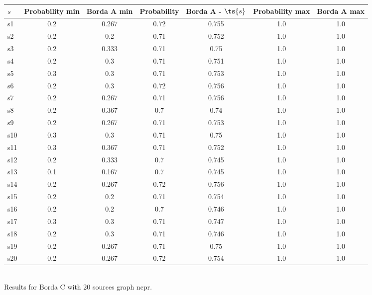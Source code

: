 \documentclass{article}
\begin{document}
\noindent\begin{tabular}{|l|c|c|c|c|c|c|}
\hline
$s$& Probability min & Borda A min & Probability & Borda A - $\ts{s}$ & Probability max & Borda A max\\
\hline
s1 &0.2 & 0.267 & 0.72 & 0.755 & 1.0 & 1.0\\
\hline
s2 &0.2 & 0.2 & 0.71 & 0.752 & 1.0 & 1.0\\
\hline
s3 &0.2 & 0.333 & 0.71 & 0.75 & 1.0 & 1.0\\
\hline
s4 &0.2 & 0.3 & 0.71 & 0.751 & 1.0 & 1.0\\
\hline
s5 &0.3 & 0.3 & 0.71 & 0.753 & 1.0 & 1.0\\
\hline
s6 &0.2 & 0.3 & 0.72 & 0.756 & 1.0 & 1.0\\
\hline
s7 &0.2 & 0.267 & 0.71 & 0.756 & 1.0 & 1.0\\
\hline
s8 &0.2 & 0.367 & 0.7 & 0.74 & 1.0 & 1.0\\
\hline
s9 &0.2 & 0.267 & 0.71 & 0.753 & 1.0 & 1.0\\
\hline
s10 &0.3 & 0.3 & 0.71 & 0.75 & 1.0 & 1.0\\
\hline
s11 &0.3 & 0.367 & 0.71 & 0.752 & 1.0 & 1.0\\
\hline
s12 &0.2 & 0.333 & 0.7 & 0.745 & 1.0 & 1.0\\
\hline
s13 &0.1 & 0.167 & 0.7 & 0.745 & 1.0 & 1.0\\
\hline
s14 &0.2 & 0.267 & 0.72 & 0.756 & 1.0 & 1.0\\
\hline
s15 &0.2 & 0.2 & 0.71 & 0.754 & 1.0 & 1.0\\
\hline
s16 &0.2 & 0.2 & 0.7 & 0.746 & 1.0 & 1.0\\
\hline
s17 &0.3 & 0.3 & 0.71 & 0.747 & 1.0 & 1.0\\
\hline
s18 &0.2 & 0.3 & 0.71 & 0.746 & 1.0 & 1.0\\
\hline
s19 &0.2 & 0.267 & 0.71 & 0.75 & 1.0 & 1.0\\
\hline
s20 &0.2 & 0.267 & 0.72 & 0.754 & 1.0 & 1.0\\
\hline
\end{tabular}\\

\noindent Results for Borda C with 20 sources graph ncpr.
\end{document}
